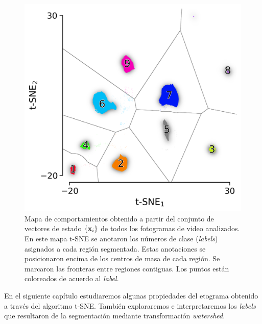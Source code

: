 \begin{figure}[!htbp]
    \centering
    \includegraphics[width=1\linewidth]{figuras/expertos/labels/segmentation.png}
    \caption{Mapa de comportamientos obtenido a partir del conjunto de vectores de estado $\{\vb{x}_i\}$ de todos los fotogramas de video analizados. En este mapa t-SNE se anotaron los números de clase (\textit{labels}) asignados a cada región segmentada. Estas anotaciones se posicionaron encima de los centros de masa de cada región. Se marcaron las fronteras entre regiones contiguas. Los puntos están coloreados de acuerdo al \textit{label}.}
    \label{fig:tsne_labels}
\end{figure}

En el siguiente capítulo estudiaremos algunas propiedades del etograma obtenido a través del algoritmo t-SNE. También exploraremos e interpretaremos los \textit{labels} que resultaron de la segmentación mediante transformación \textit{watershed}.